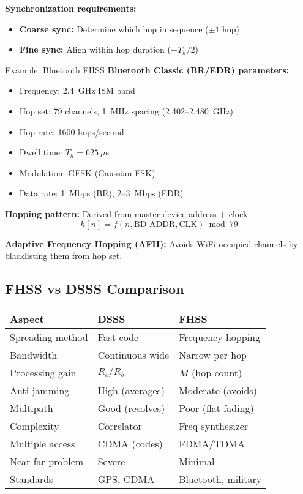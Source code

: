 \textbf{Synchronization requirements:}
\begin{itemize}
\item \textbf{Coarse sync:} Determine which hop in sequence ($\pm 1$ hop)
\item \textbf{Fine sync:} Align within hop duration ($\pm T_h/2$)
\end{itemize}

\begin{calloutbox}{Example: Bluetooth FHSS}
\textbf{Bluetooth Classic (BR/EDR) parameters:}
\begin{itemize}
\item Frequency: 2.4~GHz ISM band
\item Hop set: 79 channels, 1~MHz spacing (2.402--2.480~GHz)
\item Hop rate: 1600 hops/second
\item Dwell time: $T_h = 625~\mu$s
\item Modulation: GFSK (Gaussian FSK)
\item Data rate: 1~Mbps (BR), 2--3~Mbps (EDR)
\end{itemize}

\textbf{Hopping pattern:}
Derived from master device address + clock:
$$h[n] = f(n, \text{BD\_ADDR}, \text{CLK}) \bmod 79$$

\textbf{Adaptive Frequency Hopping (AFH):}
Avoids WiFi-occupied channels by blacklisting them from hop set.
\end{calloutbox}

\subsection{FHSS vs DSSS Comparison}

\begin{center}
\begin{tabular}{@{}lll@{}}
\toprule
\textbf{Aspect} & \textbf{DSSS} & \textbf{FHSS} \\
\midrule
Spreading method & Fast code & Frequency hopping \\
Bandwidth & Continuous wide & Narrow per hop \\
Processing gain & $R_c/R_b$ & $M$ (hop count) \\
Anti-jamming & High (averages) & Moderate (avoids) \\
Multipath & Good (resolves) & Poor (flat fading) \\
Complexity & Correlator & Freq synthesizer \\
Multiple access & CDMA (codes) & FDMA/TDMA \\
Near-far problem & Severe & Minimal \\
Standards & GPS, CDMA & Bluetooth, military \\
\bottomrule
\end{tabular}
\end{center}

